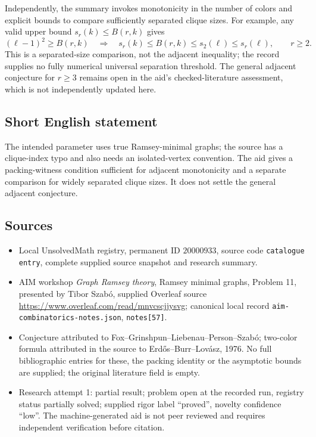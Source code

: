 \documentclass[11pt]{article}
\begin{document}
Independently, the summary invokes monotonicity in the number of colors and explicit bounds to compare sufficiently separated clique sizes. For example, any valid upper bound $s_r(k)\leq B(r,k)$ gives
\[
 (\ell-1)^2\geq B(r,k)\quad\Longrightarrow\quad
 s_r(k)\leq B(r,k)\leq s_2(\ell)\leq s_r(\ell),\qquad r\geq2.
\]
This is a separated-size comparison, not the adjacent inequality; the record supplies no fully numerical universal separation threshold. The general adjacent conjecture for $r\geq3$ remains open in the aid's checked-literature assessment, which is not independently updated here.
\subsection{Short English statement}
The intended parameter uses true Ramsey-minimal graphs; the source has a clique-index typo and also needs an isolated-vertex convention. The aid gives a packing-witness condition sufficient for adjacent monotonicity and a separate comparison for widely separated clique sizes. It does not settle the general adjacent conjecture.
\subsection{Sources}
\begin{itemize}
\item Local UnsolvedMath registry, permanent ID $20000933$, source code \texttt{catalogue entry}, complete supplied source snapshot and research summary.
\item AIM workshop \emph{Graph Ramsey theory}, Ramsey minimal graphs, Problem 11, presented by Tibor Szab\'o, supplied Overleaf source \url{https://www.overleaf.com/read/mnvcscjjysvg}; canonical local record \texttt{aim-combinatorics-notes.json}, \texttt{notes[57]}.
\item Conjecture attributed to Fox--Grinshpun--Liebenau--Person--Szab\'o; two-color formula attributed in the source to Erd\H os--Burr--Lov\'asz, 1976. No full bibliographic entries for these, the packing identity or the asymptotic bounds are supplied; the original literature field is empty.
\item Research attempt 1: partial result; problem open at the recorded run, registry status partially solved; supplied rigor label ``proved'', novelty confidence ``low''. The machine-generated aid is not peer reviewed and requires independent verification before citation.
\end{itemize}
\end{document}
